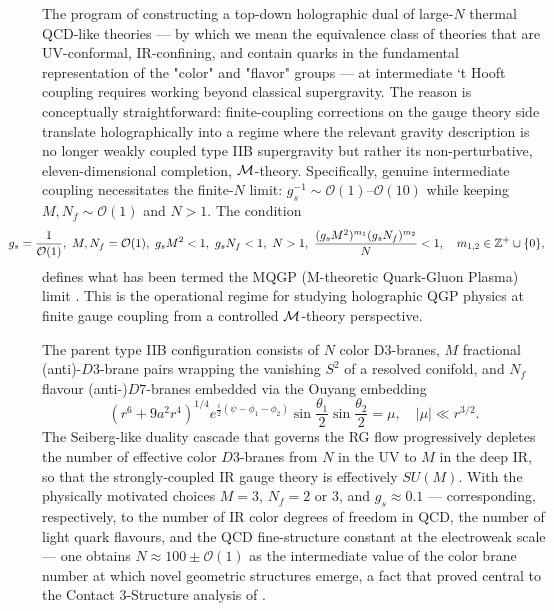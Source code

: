\documentclass[a4paper,11pt,fleqn]{article}
\theoremstyle{plain}
\theoremstyle{definition}
\begin{document}
The program of constructing a top-down holographic dual of large-$N$ thermal QCD-like
theories --- by which we mean the equivalence class of theories that are UV-conformal,
IR-confining, and contain quarks in the fundamental representation of the "color" and "flavor" groups ---
at intermediate `t Hooft coupling requires working beyond classical supergravity. The reason
is conceptually straightforward: finite-coupling corrections on the gauge theory side translate
holographically into a regime where the relevant gravity description is no longer weakly coupled
type IIB supergravity but rather its non-perturbative, eleven-dimensional completion, ${\cal M}$-theory.
Specifically, genuine intermediate coupling necessitates the finite-$N$ limit:
$g_s^{-1} \sim \mathcal{O}(1)$--$\mathcal{O}(10)$ while keeping $M, N_f \sim \mathcal{O}(1)$
and $N > 1$. The condition
\begin{equation}
\hskip -0.4in g_s=\frac{1}{{\cal O}(1)},\  M, N_f = {\cal O}(1),\ g_sM^2 < 1,\  g_s N_f < 1,\ N>1,\  \frac{(g_s M^2)^{m_1}(g_s N_f)^{m_2}}{N} <1,
\quad m_{1,2} \in \mathbb{Z}^+ \cup \{0\},
\label{eq:MQGP}
\end{equation}
defines what has been termed the MQGP (M-theoretic Quark-Gluon Plasma) limit
\cite{MQGP,NPB, ACMS}. This is the operational regime for studying holographic
QGP physics at finite gauge coupling from a controlled ${\cal M}$-theory perspective.

The parent type IIB configuration consists of $N$ color D3-branes, $M$ fractional
(anti)-$D3$-brane pairs wrapping the vanishing $S^2$ of a resolved conifold, and $N_f$ flavour
(anti-)$D7$-branes embedded via the Ouyang embedding \cite{Ouyang}
\begin{equation}
\left(r^6 + 9a^2 r^4\right)^{1/4}
e^{\frac{i}{2}(\psi - \phi_1 - \phi_2)}
\sin\frac{\theta_1}{2}\sin\frac{\theta_2}{2} = \mu,
\quad |\mu| \ll r^{3/2}.
\label{eq:Ouyang}
\end{equation}
The Seiberg-like duality cascade that governs the RG flow progressively depletes the number
of effective color $D3$-branes from $N$ in the UV to $M$ in the deep IR, so that the
strongly-coupled IR gauge theory is effectively $SU(M)$. With the physically motivated
choices $M = 3$, $N_f = 2$ or $3$, and $g_s \approx 0.1$ --- corresponding, respectively,
to the number of IR color degrees of freedom in QCD, the number of light quark flavours,
and the QCD fine-structure constant at the electroweak scale --- one obtains
$N \approx 100 \pm \mathcal{O}(1)$ as the intermediate value of the color brane number at
which novel geometric structures emerge, a fact that  proved central to the Contact
3-Structure analysis of \cite{ACMS}.
\end{document}
